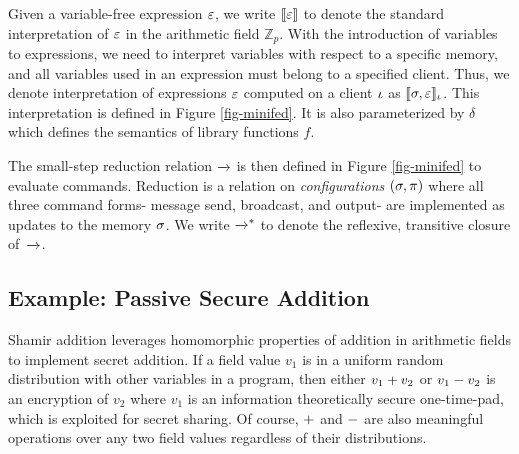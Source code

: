 Given a variable-free expression $\varepsilon$, we write $\llbracket \varepsilon \rrbracket$ to denote
the standard interpretation of $\varepsilon$ in the arithmetic field
$\mathbb{Z}_{p}$. With the introduction of variables to expressions,
we need to interpret variables with respect to a specific memory, and
all variables used in an expression must belong to a specified client.
Thus, we denote interpretation of expressions $\varepsilon$ computed on a
client $\iota$ as $\llbracket \sigma,\varepsilon \rrbracket_{\iota}$. This interpretation is
defined in Figure \ref{fig-minifed}. It is also parameterized by
$\delta$ which defines the semantics of library functions $f$.

The small-step reduction relation $\xrightarrow{}$ is then defined in Figure
\ref{fig-minifed} to evaluate commands. Reduction is a relation on
\emph{configurations} $(\sigma, \pi)$ where all three command forms-
message send, broadcast, and output- are implemented as updates to the
memory $\sigma$. We write $\xrightarrow{}^{*}$ to denote the reflexive, transitive
closure of\ $\xrightarrow{}$. 

\subsection{Example: Passive Secure Addition}

Shamir addition leverages homomorphic properties of addition in
arithmetic fields to implement secret addition. If a field value $v_1$
is in a uniform random distribution with other variables in a program,
then either  $v_1 + v_2$ or $v_1 - v_2$  is an encryption of $v_2$
where $v_1$ is an information theoretically secure one-time-pad, which
is exploited for secret sharing. Of course, $+$ and $-$ are also
meaningful operations over any two field values regardless of their distributions.

